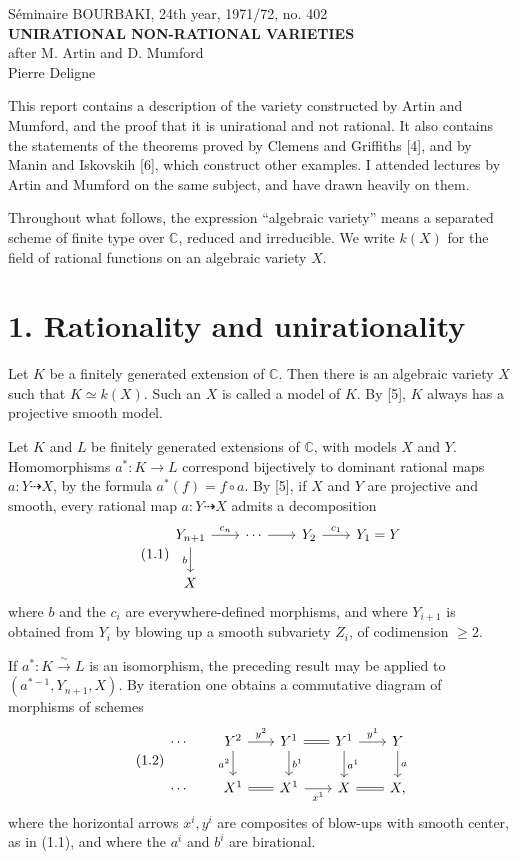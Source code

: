 \documentclass[10pt]{article}
\newcommand{\C}{\mathbb C}
\newcommand{\iso}{\xrightarrow{\sim}}
\begin{document}
\begin{center}
{\large Séminaire BOURBAKI, 24th year, 1971/72, no. 402}\\[0.4em]
{\Large\bfseries UNIRATIONAL NON-RATIONAL VARIETIES}\\[0.3em]
{\large after M. Artin and D. Mumford}\\[0.4em]
Pierre Deligne
\end{center}

This report contains a description of the variety constructed by Artin and Mumford, and the proof that it is unirational and not rational. It also contains the statements of the theorems proved by Clemens and Griffiths [4], and by Manin and Iskovskih [6], which construct other examples. I attended lectures by Artin and Mumford on the same subject, and have drawn heavily on them.

Throughout what follows, the expression ``algebraic variety'' means a separated scheme of finite type over \(\C\), reduced and irreducible. We write \(k(X)\) for the field of rational functions on an algebraic variety \(X\).

\section*{1. Rationality and unirationality}

Let \(K\) be a finitely generated extension of \(\C\). Then there is an algebraic variety \(X\) such that \(K\simeq k(X)\). Such an \(X\) is called a model of \(K\). By [5], \(K\) always has a projective smooth model.

Let \(K\) and \(L\) be finitely generated extensions of \(\C\), with models \(X\) and \(Y\). Homomorphisms \(a^*:K\to L\) correspond bijectively to dominant rational maps \(a:Y\dashrightarrow X\), by the formula \(a^*(f)=f\circ a\). By [5], if \(X\) and \(Y\) are projective and smooth, every rational map \(a:Y\dashrightarrow X\) admits a decomposition
\[
\tag{1.1}
\begin{tikzcd}[column sep=2.0em,row sep=1.8em]
Y_{n+1}\arrow[r,"c_n"]\arrow[d,"b"']&\cdots\arrow[r]&Y_2\arrow[r,"c_1"]&Y_1=Y\\
X&&&
\end{tikzcd}
\]
where \(b\) and the \(c_i\) are everywhere-defined morphisms, and where \(Y_{i+1}\) is obtained from \(Y_i\) by blowing up a smooth subvariety \(Z_i\), of codimension \(\ge2\).

If \(a^*:K\iso L\) is an isomorphism, the preceding result may be applied to \((a^{*-1},Y_{n+1},X)\). By iteration one obtains a commutative diagram of morphisms of schemes
\[
\tag{1.2}
\begin{tikzcd}[column sep=1.8em,row sep=1.8em]
\cdots & Y^2 \arrow[r,"y^2"] \arrow[d,"a^2"'] & Y^1 \arrow[r,equal] \arrow[d,"b^1"] & Y^1 \arrow[r,"y^1"]\arrow[d,"a^1"] & Y \arrow[d,"a"]\\
\cdots & X^1 \arrow[r,equal] & X^1 \arrow[r,"x^1"'] & X \arrow[r,equal] & X,
\end{tikzcd}
\]
where the horizontal arrows \(x^i,y^i\) are composites of blow-ups with smooth center, as in (1.1), and where the \(a^i\) and \(b^i\) are birational.
\end{document}
